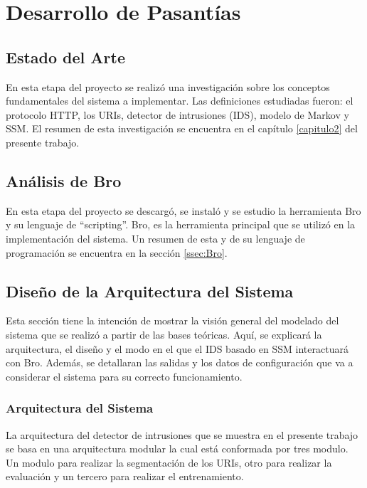 \chapter{Desarrollo de Pasantías}
\label{capitulo3}

\section{Estado del Arte}

En esta etapa del proyecto se realizó una investigación sobre los conceptos fundamentales del sistema a implementar. Las definiciones estudiadas fueron: el protocolo HTTP, los URIs, detector de intrusiones (IDS), modelo de Markov y SSM.
El resumen de esta investigación se encuentra en el capítulo \ref{capitulo2} del presente trabajo.

\section{Análisis de Bro}

En esta etapa del proyecto se descargó, se instaló y se estudio la herramienta Bro y su lenguaje de ``scripting''. Bro, es la herramienta principal que se utilizó en la implementación del sistema. Un resumen de esta y de su lenguaje de programación se encuentra en la sección \ref{ssec:Bro}.

\section{Diseño de la Arquitectura del Sistema}

Esta sección tiene la intención de mostrar la visión general del modelado del sistema que se realizó a partir de las bases teóricas. Aquí, se explicará la arquitectura, el diseño y el modo en el que el IDS basado en SSM interactuará con Bro. Además, se detallaran las salidas y los datos de configuración
que va a considerar el sistema para su correcto funcionamiento.

\subsection{Arquitectura del Sistema}

La arquitectura del detector de intrusiones que se muestra en el presente trabajo se basa en una arquitectura modular la cual está conformada por tres modulo. Un modulo para realizar la segmentación de los URIs, otro  para realizar la evaluación y un tercero para realizar el entrenamiento.

